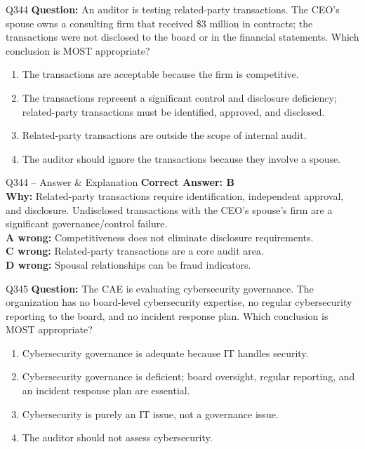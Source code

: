 \documentclass[aspectratio=169,10pt]{beamer}
\begin{document}
	\begin{frame}[t]{Q344}
		\small
		\textbf{Question:} An auditor is testing related-party transactions. The CEO's spouse owns a consulting firm that received \$3 million in contracts; the transactions were not disclosed to the board or in the financial statements. Which conclusion is MOST appropriate?
		\begin{enumerate}[label=\Alph*.,itemsep=1pt,topsep=2pt]
			\item The transactions are acceptable because the firm is competitive.
			\item The transactions represent a significant control and disclosure deficiency; related-party transactions must be identified, approved, and disclosed.
			\item Related-party transactions are outside the scope of internal audit.
			\item The auditor should ignore the transactions because they involve a spouse.
		\end{enumerate}
	\end{frame}
	
	\begin{frame}[t]{Q344 -- Answer \& Explanation}
		\small
		\textbf{Correct Answer: B} \\[4pt]
		\textbf{Why:} Related-party transactions require identification, independent approval, and disclosure. Undisclosed transactions with the CEO's spouse's firm are a significant governance/control failure. \\[4pt]
		\textbf{A wrong:} Competitiveness does not eliminate disclosure requirements. \\[2pt]
		\textbf{C wrong:} Related-party transactions are a core audit area. \\[2pt]
		\textbf{D wrong:} Spousal relationships can be fraud indicators.
	\end{frame}
	
	\begin{frame}[t]{Q345}
		\small
		\textbf{Question:} The CAE is evaluating cybersecurity governance. The organization has no board-level cybersecurity expertise, no regular cybersecurity reporting to the board, and no incident response plan. Which conclusion is MOST appropriate?
		\begin{enumerate}[label=\Alph*.,itemsep=1pt,topsep=2pt]
			\item Cybersecurity governance is adequate because IT handles security.
			\item Cybersecurity governance is deficient; board oversight, regular reporting, and an incident response plan are essential.
			\item Cybersecurity is purely an IT issue, not a governance issue.
			\item The auditor should not assess cybersecurity.
		\end{enumerate}
	\end{frame}
	
\end{document}
